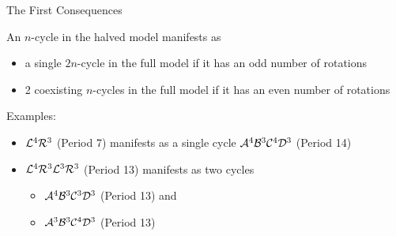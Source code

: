 \begin{frame}{The First Consequences}
	\begin{theorem}
		An $n$-cycle in the halved model manifests as
		\begin{itemize}
			\item a single $2n$-cycle in the full model if it has an odd number of rotations
			\item 2 coexisting $n$-cycles in the full model if it has an even number of rotations
		\end{itemize}
	\end{theorem}
	\pause
	Examples:
	\begin{itemize}
		\item $\mathcal{L}^4\mathcal{R}^3$ (Period 7) manifests as a single cycle $\mathcal{A}^4\mathcal{B}^3\mathcal{C}^4\mathcal{D}^3$ (Period 14)
		\item $\mathcal{L}^4\mathcal{R}^3\mathcal{L}^3\mathcal{R}^3$ (Period 13) manifests as two cycles
		      \begin{itemize}
			      \item $\mathcal{A}^4\mathcal{B}^3\mathcal{C}^3\mathcal{D}^3$ (Period 13) and
			      \item $\mathcal{A}^3\mathcal{B}^3\mathcal{C}^4\mathcal{D}^3$ (Period 13)
		      \end{itemize}
	\end{itemize}
\end{frame}

